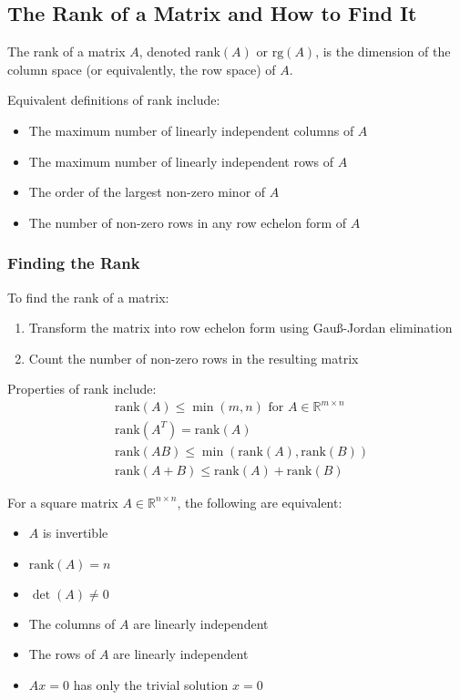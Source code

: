 \subsection{The Rank of a Matrix and How to Find It}

The rank of a matrix \(A\), denoted \(\text{rank}(A)\) or \(\text{rg}(A)\), is the dimension of the column space (or equivalently, the row space) of \(A\).

Equivalent definitions of rank include:
\begin{itemize}[label=\(-\)]
    \item The maximum number of linearly independent columns of \(A\)
    \item The maximum number of linearly independent rows of \(A\)
    \item The order of the largest non-zero minor of \(A\)
    \item The number of non-zero rows in any row echelon form of \(A\)
\end{itemize}

\subsubsection{Finding the Rank}

To find the rank of a matrix:
\begin{enumerate}
    \item Transform the matrix into row echelon form using Gauß-Jordan elimination
    \item Count the number of non-zero rows in the resulting matrix
\end{enumerate}

Properties of rank include:
\begin{align*}
&\text{rank}(A) \leq \min(m,n) \text{ for } A \in \mathbb{R}^{m \times n} \\
&\text{rank}(A^T) = \text{rank}(A) \\
&\text{rank}(AB) \leq \min(\text{rank}(A), \text{rank}(B)) \\
&\text{rank}(A+B) \leq \text{rank}(A) + \text{rank}(B)
\end{align*}

For a square matrix \(A \in \mathbb{R}^{n \times n}\), the following are equivalent:
\begin{itemize}[label=\(-\)]
    \item \(A\) is invertible
    \item \(\text{rank}(A) = n\)
    \item \(\det(A) \neq 0\)
    \item The columns of \(A\) are linearly independent
    \item The rows of \(A\) are linearly independent
    \item \(Ax = 0\) has only the trivial solution \(x = 0\)
\end{itemize}

